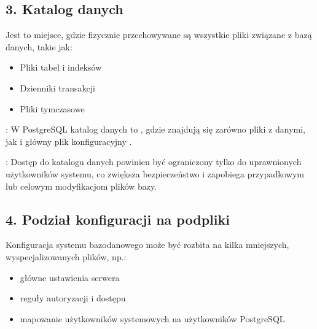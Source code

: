 \documentclass[letterpaper,10pt,polish]{sphinxmanual}
\begin{document}
\subsection{3. Katalog danych}
\label{\detokenize{rozdzial2/Konfiguracja_baz_danych/Konfiguracja_baz_danych:katalog-danych}}
\sphinxAtStartPar
Jest to miejsce, gdzie fizycznie przechowywane są wszystkie pliki związane z bazą danych, takie jak:
\begin{itemize}
\item {} 
\sphinxAtStartPar
Pliki tabel i indeksów

\item {} 
\sphinxAtStartPar
Dzienniki transakcji

\item {} 
\sphinxAtStartPar
Pliki tymczasowe

\end{itemize}

\sphinxAtStartPar
{}: W PostgreSQL katalog danych to , gdzie znajdują się zarówno pliki z danymi, jak i główny plik konfiguracyjny .

\sphinxAtStartPar
{}: Dostęp do katalogu danych powinien być ograniczony tylko do uprawnionych użytkowników systemu, co zwiększa bezpieczeństwo i zapobiega przypadkowym lub celowym modyfikacjom plików bazy.


\subsection{4. Podział konfiguracji na podpliki}
\label{\detokenize{rozdzial2/Konfiguracja_baz_danych/Konfiguracja_baz_danych:podzial-konfiguracji-na-podpliki}}
\sphinxAtStartPar
Konfiguracja systemu bazodanowego może być rozbita na kilka mniejszych, wyspecjalizowanych plików, np.:
\begin{itemize}
\item {} 
\sphinxAtStartPar
{} \textendash{} główne ustawienia serwera

\item {} 
\sphinxAtStartPar
{} \textendash{} reguły autoryzacji i dostępu

\item {} 
\sphinxAtStartPar
{} \textendash{} mapowanie użytkowników systemowych na użytkowników PostgreSQL

\end{itemize}
\end{document}
